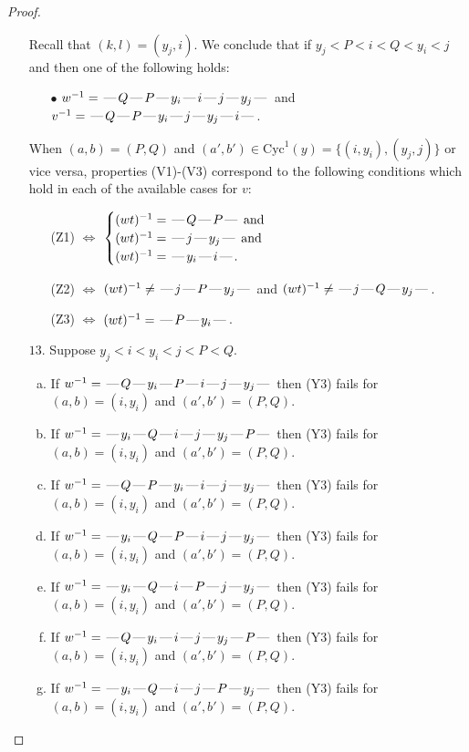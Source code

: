 \documentclass[10pt]{article}
\theoremstyle{definition}
\theoremstyle{definition}
\def\dash{\text{\hspace{0.5mm}---\hspace{0.5mm}}}
\def\Cyc{\mathrm{Cyc}}
\begin{document}
\begin{proof}
\begin{enumerate}
Recall that $(k,l) = (y_j,i)$.
We conclude that if $y_j < P < i < Q < y_i < j$ and then one of the following holds:
\begin{enumerate}
\item[$\bullet$] $w^{-1} = \dash Q\dash P\dash y_i\dash i\dash j\dash y_j\dash $ and $v^{-1} = \dash Q\dash P\dash y_i\dash j\dash y_j\dash i\dash $.
\end{enumerate}
When $(a,b)= (P,Q)$ and $(a',b')\in \Cyc^1(y)=\{(i,y_i),(y_j,j)\}$ or vice versa,
properties (V1)-(V3) correspond to the following conditions which hold in
each of the available cases for $v$:
\begin{enumerate}
\item[](Z1) $\Leftrightarrow$ $\begin{cases}\text{$(wt)^{-1} = \dash Q \dash P \dash$}\text{ and }\\
\text{$(wt)^{-1} = \dash j \dash y_j \dash$}\text{ and }\\
\text{$(wt)^{-1} = \dash y_i \dash i \dash$}.\end{cases}$
\item[](Z2) $\Leftrightarrow$ $(wt)^{-1} \neq \dash j \dash P \dash y_j \dash$ and $(wt)^{-1}\neq \dash j \dash Q \dash y_j \dash$.
\item[](Z3) $\Leftrightarrow$ $(wt)^{-1} = \dash P \dash y_i \dash$.
\end{enumerate}
\item[$13$.] Suppose $y_j < i < y_i < j < P < Q$.
\begin{enumerate}[(a)]
\item If $w^{-1} = \dash Q\dash y_i\dash P\dash i\dash j\dash y_j\dash $ then (Y3) fails for $(a,b)=(i,y_i)$ and $(a',b')=(P,Q)$.
\item If $w^{-1} = \dash y_i\dash Q\dash i\dash j\dash y_j\dash P\dash $ then (Y3) fails for $(a,b)=(i,y_i)$ and $(a',b')=(P,Q)$.
\item If $w^{-1} = \dash Q\dash P\dash y_i\dash i\dash j\dash y_j\dash $ then (Y3) fails for $(a,b)=(i,y_i)$ and $(a',b')=(P,Q)$.
\item If $w^{-1} = \dash y_i\dash Q\dash P\dash i\dash j\dash y_j\dash $ then (Y3) fails for $(a,b)=(i,y_i)$ and $(a',b')=(P,Q)$.
\item If $w^{-1} = \dash y_i\dash Q\dash i\dash P\dash j\dash y_j\dash $ then (Y3) fails for $(a,b)=(i,y_i)$ and $(a',b')=(P,Q)$.
\item If $w^{-1} = \dash Q\dash y_i\dash i\dash j\dash y_j\dash P\dash $ then (Y3) fails for $(a,b)=(i,y_i)$ and $(a',b')=(P,Q)$.
\item If $w^{-1} = \dash y_i\dash Q\dash i\dash j\dash P\dash y_j\dash $ then (Y3) fails for $(a,b)=(i,y_i)$ and $(a',b')=(P,Q)$.

\end{enumerate}
\end{enumerate}
\end{proof}
\end{document}
